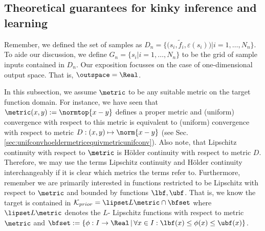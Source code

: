\subsection{Theoretical guarantees for kinky inference and learning}
\label{sec:targetest_multidim}

 Remember, we defined the set of samples as $D_n= \{\bigl( s_i, \tilde f_i, \varepsilon(s_i) \bigr) \vert i=1,\ldots, N_n \} $. To aide our discussion, we define $G_n =\{s_i | i =1,\ldots,N_n\}$ to be the grid of sample inputs contained in $D_n$.
Our exposition focusses on the case of one-dimensional output space. That is, $\outspace = \Real$.


In this subsection, we assume $\metric$ to be any suitable metric on the target function domain. For instance, we have seen that  $\metric(x,y) := \normtop{x-y}$ defines a proper metric and (uniform) convergence with respect to this metric is equivalent to (uniform) convergence with respect to metric $ D: (x,y) \mapsto \norm{x-y}$ (see Sec. \ref{sec:unifconvhoeldermetricequivmetricunifconv}). Also note, that Lipschitz continuity with respect to $\metric$ is H\"older continuity with respect to metric $D$. Therefore, we may use the terms Lipschitz continuity and H\"older continuity interchangeably if it is clear which metrics the terms refer to.
Furthermore, remember we are primarily interested in functions restricted to be Lipschitz with respect to $\metric$ and bounded by functions $\lbf,\ubf$. That is, we know the target is contained in $\mathcal K_{prior} = \lipset L \metric  \cap \bfset$ where $\lipset L \metric$ denotes the $L$- Lipschitz functions with respect to metric $\metric$ and $\bfset :=\{\phi : I \to \Real \, | \, \forall x \in I : \lbf(x) \leq \phi(x) \leq \ubf(x)\} $. 

%

